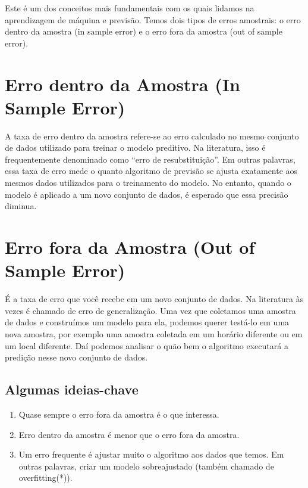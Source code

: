 \documentclass[
  letterpaper,
  DIV=11,
  numbers=noendperiod]{scrreprt}
\begin{document}
Este é um dos conceitos mais fundamentais com os quais lidamos na
aprendizagem de máquina e previsão. Temos dois tipos de erros amostrais:
o erro dentro da amostra (in sample error) e o erro fora da amostra (out
of sample error).


\hypertarget{erro-dentro-da-amostra-in-sample-error}{%
\chapter{Erro dentro da Amostra (In Sample
Error)}\label{erro-dentro-da-amostra-in-sample-error}}

A taxa de erro dentro da amostra refere-se ao erro calculado no mesmo
conjunto de dados utilizado para treinar o modelo preditivo. Na
literatura, isso é frequentemente denominado como ``erro de
resubstituição''. Em outras palavras, essa taxa de erro mede o quanto
algoritmo de previsão se ajusta exatamente aos mesmos dados utilizados
para o treinamento do modelo. No entanto, quando o modelo é aplicado a
um novo conjunto de dados, é esperado que essa precisão diminua.


\hypertarget{erro-fora-da-amostra-out-of-sample-error}{%
\chapter{Erro fora da Amostra (Out of Sample
Error)}\label{erro-fora-da-amostra-out-of-sample-error}}

É a taxa de erro que você recebe em um novo conjunto de dados. Na
literatura às vezes é chamado de erro de generalização. Uma vez que
coletamos uma amostra de dados e construímos um modelo para ela, podemos
querer testá-lo em uma nova amostra, por exemplo uma amostra coletada em
um horário diferente ou em um local diferente. Daí podemos analisar o
quão bem o algoritmo executará a predição nesse novo conjunto de dados.

\hypertarget{algumas-ideias-chave}{%
\section{Algumas ideias-chave}\label{algumas-ideias-chave}}

\begin{enumerate}
\def\labelenumi{\arabic{enumi}.}
\item
  Quase sempre o erro fora da amostra é o que interessa.
\item
  Erro dentro da amostra é menor que o erro fora da amostra.
\item
  Um erro frequente é ajustar muito o algoritmo aos dados que temos. Em
  outras palavras, criar um modelo sobreajustado (também chamado de
  overfitting(*)).
\end{enumerate}
\end{document}
